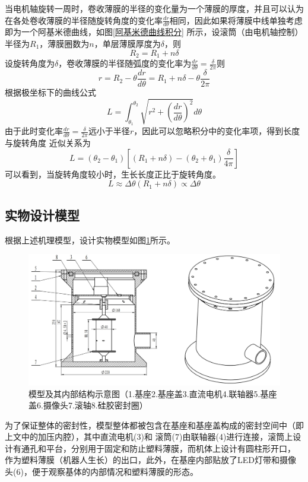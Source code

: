 \documentclass[11pt, a4paper, oneside]{ctexart}
\begin{document}
当电机轴旋转一周时，卷收薄膜的半径的变化量为一个薄膜的厚度，并且可以认为在各处卷收薄膜的半径随旋转角度的变化率$\frac{dr}{d\theta}$相同，因此如果将薄膜中线单独考虑即为一个阿基米德曲线，如图\ref{阿基米德曲线积分}
所示，设滚筒（由电机轴控制）半径为$R_1$，薄膜圈数为$n$，单层薄膜厚度为$\delta$，则
$$
R_2=R_1+n\delta
$$
设旋转角度为$\delta$，卷收薄膜的半径随弧度的变化率为$\frac{dr}{d\theta}=\frac{\delta}{2\pi}$则
$$
r=R_2-\theta \frac{dr}{d\theta}=R_1+n\delta-\theta \frac{\delta}{2\pi}
$$
根据极坐标下的曲线公式
$$
L=\int_{\theta_1}^{\theta_2}\sqrt{r^2+\left(\frac{dr}{d\theta}\right)^2}d\theta
$$
由于此时变化率$\frac{dr}{d\theta}=\frac{\delta}{2\pi}$远小于半径$r$，因此可以忽略积分中的变化率项，得到长度与旋转角度
近似关系为
$$
L=(\theta_2-\theta_1)[(R_1+n\delta)-(\theta_2+\theta_1)\frac{\delta}{4\pi}]
$$
可以看到，当旋转角度较小时，生长长度正比于旋转角度。
$$
L\approx \Delta\theta(R_1+n\delta)\propto \Delta\theta
$$

\subsection{实物设计模型}
根据上述机理模型，设计实物模型如图\ref{模型草图}所示。

\begin{figure}[H]
    \centering
    \includegraphics[scale=0.3]{模型草图}
    \caption{模型及其内部结构示意图（1.基座2.基座盖3.直流电机4.联轴器5.基座盖6.摄像头7.滚轴8.硅胶密封圈）}
    \label{模型草图}
\end{figure}

为了保证整体的密封性，模型整体都被包含在基座和基座盖构成的密封空间中（即上文中的加压内腔），其中直流电机(3)和
滚筒(7)由联轴器(4)进行连接，滚筒上设计有通孔和平台，分别用于固定和防止塑料薄膜，而机体上设计有圆柱形开口，
作为塑料薄膜（机器人生长）的出口，此外，在基座内部贴放了LED灯带和摄像头(6)，便于观察基体的内部情况和塑料薄膜的形态。
\end{document}
